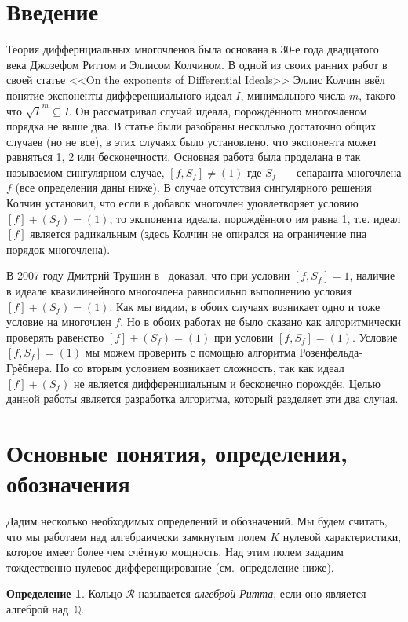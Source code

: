 \documentclass[16pt]{article}
\theoremstyle{plain1}
\theoremstyle{plain2}
\theoremstyle{plain}
\theoremstyle{plain3}
\theoremstyle{definition}
\newtheorem{definition}[theorem2]{Определение}
\theoremstyle{remark}
\begin{document}
\section{Введение}

Теория диффернциальных многочленов была основана в 30-е года  двадцатого века Джозефом Риттом и Эллисом Колчином. В одной из своих ранних работ в своей статье <<On the exponents of Differential Ideals>>\cite{E. R. Kolchin} Эллис Колчин ввёл понятие экспоненты дифференциального идеал $I$, минимального числа $m$, такого что $\sqrt{I}^m\subseteq I$. Он рассматривал случай идеала, порождённого многочленом порядка не выше два. В статье были разобраны несколько достаточно общих случаев (но не все), в этих случаях было установлено, что экспонента может равняться 1, 2 или бесконечности.  Основная работа была проделана в так называемом сингулярном случае, $[f,S_f]\ne(1)$ где $S_f$~--- сепаранта многочлена $f$ (все определения даны ниже). В случае отсутствия сингулярного решения Колчин  установил, что если в добавок многочлен удовлетворяет условию $[f]+(S_f)=(1)$, то экспонента идеала, порождённого им равна 1, т.е. идеал $[f]$ является радикальным (здесь Колчин не опирался на ограничение пна порядок многочлена).

В 2007 году Дмитрий Трушин в~\cite{Trushin} доказал, что при условии $[f,S_f]=1$, наличие в идеале квазилинейного многочлена равносильно выполнению условия $[f]+(S_f)=(1)$. Как мы видим, в обоих случаях возникает одно и тоже условие на многочлен $f$.   Но в обоих работах не было сказано как алгоритмически проверять равенство  $[f]+(S_f)=(1)$ при условии  $[f,S_f]=(1)$. Условие $[f,S_f]=(1)$ мы можем проверить с помощью алгоритма Розенфельда-Грёбнера. Но со вторым условием возникает сложность, так как идеал $[f]+(S_f)$ не является дифференциальным и бесконечно порождён. Целью данной работы является разработка  алгоритма, который разделяет эти два случая.

\section{Основные понятия, определения, обозначения}
Дадим несколько необходимых определений и обозначений. Мы будем считать, что мы работаем над алгебраически замкнутым полем ${K}$ нулевой характеристики, которое имеет более чем счётную мощность. Над этим полем зададим тождественно нулевое дифференцирование (см.~определение ниже).

\begin{definition}
Кольцо $\mathcal{R}$ называется \emph{алгеброй Ритта}, если оно является алгеброй над~$\mathbb{Q}$.
\end{definition}
\end{document}
